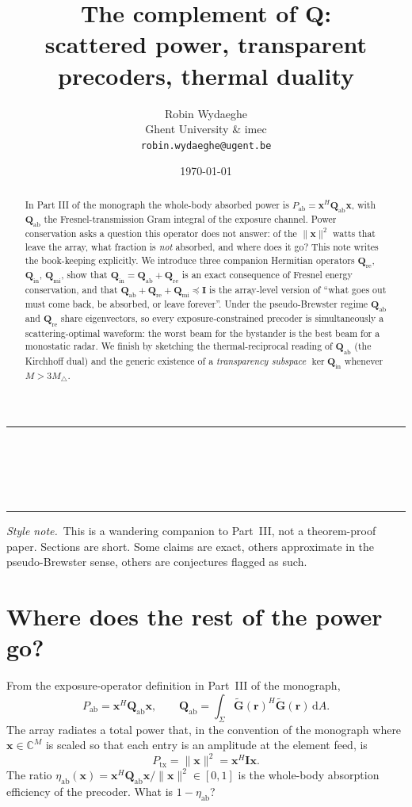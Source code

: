\documentclass[11pt,a4paper]{article}
\title{\textbf{The complement of $\mathbf{Q}$:\\
scattered power, transparent precoders, thermal duality}}
\author{Robin Wydaeghe\\
 Ghent University \& imec\\
 \texttt{robin.wydaeghe@ugent.be}}
\date{\today}
\makeatletter
\theoremstyle{definition}
\newcommand{\rr}{\mathbf{r}}
\newcommand{\diff}{\mathrm{d}}
\newcommand{\Complex}{\mathbb{C}}
\newcommand{\Gtil}{\tilde{\mathbf{G}}}
\newcommand{\Qabs}{\mathbf{Q}_{\mathrm{ab}}}
\newcommand{\Qref}{\mathbf{Q}_{\mathrm{re}}}
\newcommand{\Qinn}{\mathbf{Q}_{\mathrm{in}}}
\newcommand{\Qmis}{\mathbf{Q}_{\mathrm{mi}}}
\renewcommand{\maketitle}{%
  \thispagestyle{plain}%
  \begin{center}
    \rule{\linewidth}{1pt}\\[0.4em]
    {\LARGE\bfseries \@title}\\[0.5em]
    {\large \@author}\\[0.3em]
    {\small \@date}\\[0.4em]\rule{\linewidth}{1pt}
  \end{center}
  \vspace{0.5em}
}
\makeatother
\begin{document}
\maketitle

\begin{abstract}
In Part III of the monograph the whole-body absorbed power is
$P_{\mathrm{ab}}=\mathbf{x}^H\Qabs\mathbf{x}$, with $\Qabs$ the
Fresnel-transmission Gram integral of the exposure channel.
Power conservation asks a question this operator does not answer:
of the $\|\mathbf{x}\|^2$ watts that leave the array, what fraction
is \emph{not} absorbed, and where does it go?
This note writes the book-keeping explicitly.  We introduce three
companion Hermitian operators $\Qref$, $\Qinn$, $\Qmis$, show that
$\Qinn=\Qabs+\Qref$ is an exact consequence of Fresnel energy
conservation, and that
$\Qabs+\Qref+\Qmis\preceq\mathbf{I}$ is the array-level version of
``what goes out must come back, be absorbed, or leave forever''.
Under the pseudo-Brewster regime $\Qabs$ and $\Qref$ share
eigenvectors, so every exposure-constrained precoder is
simultaneously a scattering-optimal waveform: the worst beam for
the bystander is the best beam for a monostatic radar.  We finish
by sketching the thermal-reciprocal reading of $\Qabs$ (the
Kirchhoff dual) and the generic existence of a \emph{transparency
subspace} $\ker\Qinn$ whenever $M>3M_{\triangle}$.
\end{abstract}

\vspace{0.3em}
\noindent\textit{Style note.}~This is a wandering companion to
Part~III, not a theorem-proof paper.  Sections are short.  Some
claims are exact, others approximate in the pseudo-Brewster sense,
others are conjectures flagged as such.

\tableofcontents
\bigskip

\section{Where does the rest of the power go?}

From the exposure-operator definition in Part~III of the monograph,
\begin{equation}
  P_{\mathrm{ab}} = \mathbf{x}^H\Qabs\mathbf{x},
  \qquad
  \Qabs = \int_\Sigma \Gtil(\rr)^H\Gtil(\rr)\,\diff A.
\end{equation}
The array radiates a total power that, in the convention of the
monograph where $\mathbf{x}\in\Complex^M$ is scaled so that each
entry is an amplitude at the element feed, is
\begin{equation}\label{eq:Ptx}
  P_{\mathrm{tx}} = \|\mathbf{x}\|^2 = \mathbf{x}^H\mathbf{I}\mathbf{x}.
\end{equation}
The ratio $\eta_{\mathrm{ab}}(\mathbf{x})
=\mathbf{x}^H\Qabs\mathbf{x}/\|\mathbf{x}\|^2\in[0,1]$ is the
whole-body absorption efficiency of the precoder.  What is
$1-\eta_{\mathrm{ab}}$?
\end{document}
